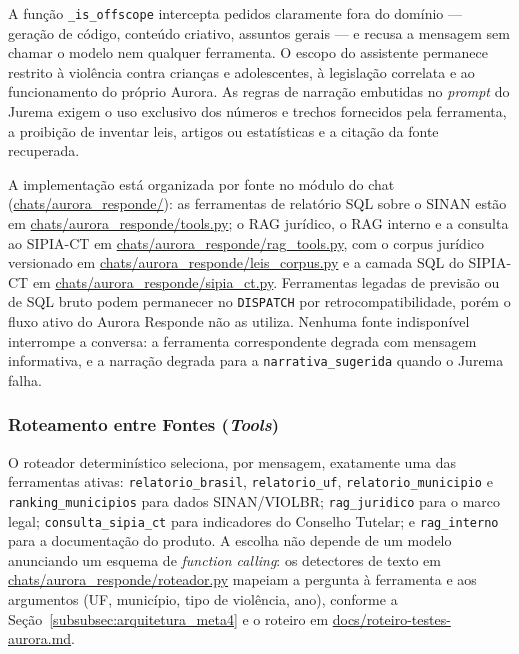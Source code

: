 \documentclass[11pt,a4paper]{article}
\begin{document}
A função \texttt{\_is\_offscope} intercepta pedidos claramente fora do domínio — geração de código, conteúdo criativo, assuntos gerais — e recusa a mensagem sem chamar o modelo nem qualquer ferramenta. O escopo do assistente permanece restrito à violência contra crianças e adolescentes, à legislação correlata e ao funcionamento do próprio Aurora. As regras de narração embutidas no \textit{prompt} do Jurema exigem o uso exclusivo dos números e trechos fornecidos pela ferramenta, a proibição de inventar leis, artigos ou estatísticas e a citação da fonte recuperada.

A implementação está organizada por fonte no módulo do chat (\url{chats/aurora_responde/}): as ferramentas de relatório SQL sobre o SINAN estão em \url{chats/aurora_responde/tools.py}; o RAG jurídico, o RAG interno e a consulta ao SIPIA-CT em \url{chats/aurora_responde/rag_tools.py}, com o corpus jurídico versionado em \url{chats/aurora_responde/leis_corpus.py} e a camada SQL do SIPIA-CT em \url{chats/aurora_responde/sipia_ct.py}. Ferramentas legadas de previsão ou de SQL bruto podem permanecer no \texttt{DISPATCH} por retrocompatibilidade, porém o fluxo ativo do Aurora Responde não as utiliza. Nenhuma fonte indisponível interrompe a conversa: a ferramenta correspondente degrada com mensagem informativa, e a narração degrada para a \texttt{narrativa\_sugerida} quando o Jurema falha.

\subsubsection{Roteamento entre Fontes (\textit{Tools})}
\label{subsubsec:roteamento_fontes_meta4}

O roteador determinístico seleciona, por mensagem, exatamente uma das ferramentas ativas: \texttt{relatorio\_brasil}, \texttt{relatorio\_uf}, \texttt{relatorio\_municipio} e \texttt{ranking\_municipios} para dados SINAN/VIOLBR; \texttt{rag\_juridico} para o marco legal; \texttt{consulta\_sipia\_ct} para indicadores do Conselho Tutelar; e \texttt{rag\_interno} para a documentação do produto. A escolha não depende de um modelo anunciando um esquema de \textit{function calling}: os detectores de texto em \url{chats/aurora_responde/roteador.py} mapeiam a pergunta à ferramenta e aos argumentos (UF, município, tipo de violência, ano), conforme a Seção~\ref{subsubsec:arquitetura_meta4} e o roteiro em \url{docs/roteiro-testes-aurora.md}.
\end{document}
